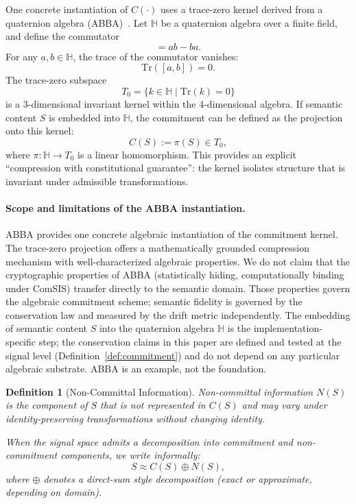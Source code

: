 \documentclass[11pt,a4paper]{article}
\newtheorem{definition}[theorem]{Definition}
\begin{document}
One concrete instantiation of $C(\cdot)$ uses a trace-zero kernel derived from a quaternion algebra (ABBA)~\cite{abba2026}. Let $\mathbb{H}$ be a quaternion algebra over a finite field, and define the commutator
\begin{equation}
[a,b] = ab - ba.
\end{equation}
For any $a,b \in \mathbb{H}$, the trace of the commutator vanishes:
\begin{equation}
\mathrm{Tr}([a,b]) = 0.
\end{equation}
The trace-zero subspace
\begin{equation}
T_0 = \{ k \in \mathbb{H} \mid \mathrm{Tr}(k) = 0 \}
\end{equation}
is a 3-dimensional invariant kernel within the 4-dimensional algebra. If semantic content $S$ is embedded into $\mathbb{H}$, the commitment can be defined as the projection onto this kernel:
\begin{equation}
C(S) := \pi(S) \in T_0,
\end{equation}
where $\pi: \mathbb{H} \rightarrow T_0$ is a linear homomorphism. This provides an explicit ``compression with constitutional guarantee'': the kernel isolates structure that is invariant under admissible transformations.

\paragraph{Scope and limitations of the ABBA instantiation.}
ABBA provides one concrete algebraic instantiation of the commitment kernel. The trace-zero projection offers a mathematically grounded compression mechanism with well-characterized algebraic properties. We do not claim that the cryptographic properties of ABBA (statistically hiding, computationally binding under ComSIS) transfer directly to the semantic domain. Those properties govern the algebraic commitment scheme; semantic fidelity is governed by the conservation law and measured by the drift metric independently. The embedding of semantic content $S$ into the quaternion algebra $\mathbb{H}$ is the implementation-specific step; the conservation claims in this paper are defined and tested at the signal level (Definition~\ref{def:commitment}) and do not depend on any particular algebraic substrate. ABBA is an example, not the foundation.

\begin{definition}[Non-Committal Information]
Non-committal information $N(S)$ is the component of $S$ that is not represented in $C(S)$ and may vary under identity-preserving transformations without changing identity.

When the signal space admits a decomposition into commitment and non-commitment components, we write informally:
\begin{equation}
S \approx C(S) \oplus N(S),
\end{equation}
where $\oplus$ denotes a direct-sum style decomposition (exact or approximate, depending on domain).
\end{definition}
\end{document}
